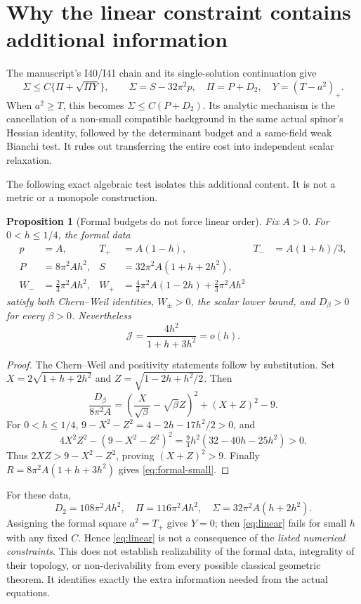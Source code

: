 \documentclass[11pt]{article}
\newtheorem{proposition}{Proposition}[section]
\theoremstyle{remark}
\newcommand{\J}{\mathcal J}
\begin{document}
\section{Why the linear constraint contains additional information}

The manuscript's I40/I41 chain and its single-solution continuation give
\begin{equation}\label{eq:linear}
 \Sigma\le C\{\Pi+\sqrt{\Pi Y}\},\qquad
 \Sigma=S-32\pi^2p,\quad\Pi=P+D_2,\quad Y=(T-a^2)_+.
\end{equation}
When $a^2\ge T$, this becomes $\Sigma\le C(P+D_2)$.
Its analytic mechanism is the cancellation of a non-small compatible
background in the same actual spinor's Hessian identity, followed by
the determinant budget and a same-field weak Bianchi test. It rules
out transferring the entire cost into independent scalar relaxation.

The following exact algebraic test isolates this additional content.
It is not a metric or a monopole construction.

\begin{proposition}[Formal budgets do not force linear order]
Fix $A>0$. For $0<h\le1/4$, the formal data
\begin{align}
 p&=A,&T_+&=A(1-h),&T_-&=A(1+h)/3,\\
 P&=8\pi^2Ah^2,&S&=32\pi^2A(1+h+2h^2),\\
 W_-&=\tfrac23\pi^2Ah^2,&
 W_+&=\tfrac43\pi^2A(1-2h)+\tfrac23\pi^2Ah^2
\end{align}
satisfy both Chern--Weil identities, $W_\pm>0$, the scalar lower
bound, and $D_\beta>0$ for every $\beta>0$. Nevertheless
\begin{equation}\label{eq:formal-small}
 \J=\frac{4h^2}{1+h+3h^2}=o(h).
\end{equation}
\end{proposition}
\begin{proof}
The Chern--Weil and positivity statements follow by substitution.
Set $X=2\sqrt{1+h+2h^2}$ and
$Z=\sqrt{1-2h+h^2/2}$. Then
\[
 \frac{D_\beta}{8\pi^2A}
 =\left(\frac X{\sqrt\beta}-\sqrt\beta Z\right)^2+(X+Z)^2-9.
\]
For $0<h\le1/4$, $9-X^2-Z^2=4-2h-17h^2/2>0$, and
\[
 4X^2Z^2-(9-X^2-Z^2)^2
 =\tfrac94h^2(32-40h-25h^2)>0.
\]
Thus $2XZ>9-X^2-Z^2$, proving $(X+Z)^2>9$.
Finally $R=8\pi^2A(1+h+3h^2)$ gives \eqref{eq:formal-small}.
\end{proof}
For these data,
\begin{equation}
 D_2=108\pi^2Ah^2,\quad
 \Pi=116\pi^2Ah^2,\quad
 \Sigma=32\pi^2A(h+2h^2).
\end{equation}
Assigning the formal square $a^2=T_+$ gives $Y=0$; then
\eqref{eq:linear} fails for small $h$ with any fixed $C$.
Hence \eqref{eq:linear} is not a consequence of the \emph{listed
numerical constraints}. This does not establish realizability of the
formal data, integrality of their topology, or non-derivability from
every possible classical geometric theorem. It identifies exactly the
extra information needed from the actual equations.
\end{document}
